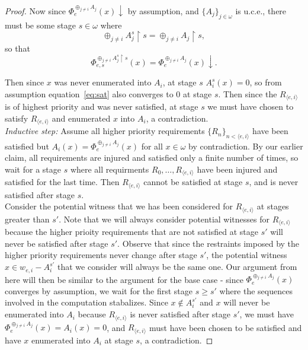 \documentclass{article}
\begin{document}
\begin{enumerate}[label={(\roman*)}]
\begin{proof}
        Now since $\Phi_e^{\oplus_{j\neq i} A_j}(x)\downarrow$ by
        assumption, and $\{A_j\}_{j\in\omega}$ is u.c.e., there must be
        some stage $s\in\omega$ where
        \[\oplus_{j\neq i} A_j^s \restriction s =\oplus_{j\neq i} A_j
        \restriction s,\]
        so that
        \begin{equation}
          \Phi_{e,s}^{\oplus_{j\neq i} A_j^s \restriction s}(x)
          =\Phi_e^{\oplus_{j\neq i} A_j}(x) \downarrow.
          \label{eq:sat}
        \end{equation}

        Then since $x$ was never enumerated into $A_i$, at stage $s$
        $A_i^s(x)=0$, so from assumption equation~\eqref{eq:sat} also
        converges to 0 at stage $s$. Then since the $R_{\langle
        e,i\rangle}$ is of highest priority and was never satisfied, at
        stage $s$ we must have chosen to satisfy $R_{\langle
        e,i\rangle}$ and enumerated $x$ into $A_i$, a contradiction. \\

        \textit{Inductive step:} Assume all higher priority requirements
        $\{R_n\}_{n <\langle e,i\rangle}$ have been satisfied but
        $A_i(x)=\Phi_e^{\oplus_{j\neq i} A_j}(x)$ for all $x\in\omega$ by
        contradiction. By our earlier claim, all requirements are injured
        and satisfied only a finite number of times, so wait for a stage
        $s$ where all requirments $R_0,\ldots,R_{\langle e,i\rangle}$ have
        been injured and satisfied for the last time. Then $R_{\langle
        e,i\rangle}$ cannot be satisfied at stage $s$, and is never
        satisfied after stage $s$. \\

        Consider the potential witness that we has been considered for
        $R_{\langle e,i\rangle}$ at stages greater than $s'$. Note that we
        will always consider potential witnesses for $R_{\langle
        e,i\rangle}$ because the higher prioity requirements that are not
        satisfied at stage $s'$ will never be satisfied after stage $s'$.
        Observe that since the restraints imposed by the higher priority
        requirements never change after stage $s'$, the potential witness
        $x\in w_{e,i}-A_i^{s'}$ that we consider will always be the same
        one. Our argument from here will then be similar to the argument
        for the base case - since $\Phi_e^{\oplus_{j\neq i} A_j}(x)$
        converges by assumption, we wait for the first stage $s\geq s'$
        where the sequences involved in the computation stabalizes. Since
        $x\not\in A_i^{s'}$ and $x$ will never be enumerated into $A_i$
        because $R_{\langle e,i\rangle}$ is never satisfied after stage
        $s'$, we must have $\Phi_e^{\oplus_{j\neq i} A_j}(x)=A_i(x)=0$, and
        $R_{\langle e,i\rangle}$ must have been chosen to be satisfied and
        have $x$ enumerated into $A_i$ at stage $s$, a contradiction.
      \end{proof}
  \end{enumerate}
\end{document}
